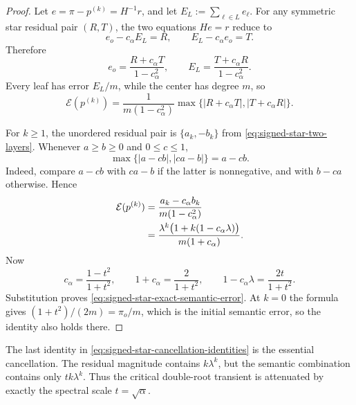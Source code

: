 \begin{proof}
Let $e=\pi-p^{(k)}=H^{-1}r$, and let
$E_L:=\sum_{\ell\in L}e_\ell$.  For any symmetric star residual pair
$(R,T)$, the two equations $He=r$ reduce to
\begin{equation}
  e_o-c_\alpha E_L=R,
  \qquad
  E_L-c_\alpha e_o=T.
  \label{eq:signed-star-error-system}
\end{equation}
Therefore
\begin{equation}
  e_o=\frac{R+c_\alpha T}{1-c_\alpha^2},
  \qquad
  E_L=\frac{T+c_\alpha R}{1-c_\alpha^2}.
  \label{eq:signed-star-error-solution}
\end{equation}
Every leaf has error $E_L/m$, while the center has degree $m$, so
\begin{equation}
  \mathcal E(p^{(k)})
  =\frac{1}{m(1-c_\alpha^2)}
    \max\{|R+c_\alpha T|,|T+c_\alpha R|\}.
  \label{eq:signed-star-semantic-max}
\end{equation}

For $k\ge1$, the unordered residual pair is $\{a_k,-b_k\}$ from
\eqref{eq:signed-star-two-layers}.  Whenever $a\ge b\ge0$ and
$0\le c\le1$,
\[
  \max\{|a-cb|,|ca-b|\}=a-cb.
\]
Indeed, compare $a-cb$ with $ca-b$ if the latter is nonnegative, and with
$b-ca$ otherwise.  Hence
\begin{align}
  \mathcal E(p^{(k)})
  &=\frac{a_k-c_\alpha b_k}{m(1-c_\alpha^2)} \notag\\
  &=\frac{\lambda^k\bigl(1+k(1-c_\alpha\lambda)\bigr)}
          {m(1+c_\alpha)}.
  \label{eq:signed-star-semantic-before-cancel}
\end{align}
Now
\begin{equation}
  c_\alpha=\frac{1-t^2}{1+t^2},
  \qquad
  1+c_\alpha=\frac{2}{1+t^2},
  \qquad
  1-c_\alpha\lambda=\frac{2t}{1+t^2}.
  \label{eq:signed-star-cancellation-identities}
\end{equation}
Substitution proves \eqref{eq:signed-star-exact-semantic-error}.  At $k=0$
the formula gives $(1+t^2)/(2m)=\pi_o/m$, which is the initial semantic
error, so the identity also holds there.
\end{proof}

The last identity in \eqref{eq:signed-star-cancellation-identities} is the
essential cancellation.  The residual magnitude contains $k\lambda^k$, but
the semantic combination contains only $tk\lambda^k$.  Thus the critical
double-root transient is attenuated by exactly the spectral scale
$t=\sqrt\alpha$.

